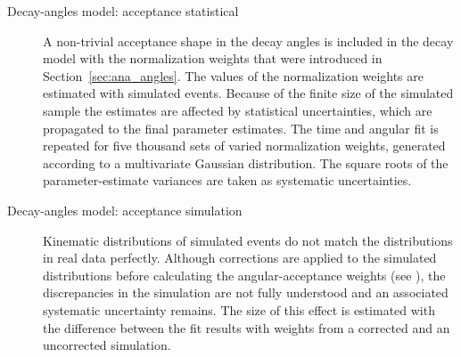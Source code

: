 \begin{description}
\item[Decay-angles model: acceptance statistical]
A non-trivial acceptance shape in the decay angles is included in the decay model with the normalization weights that were introduced in
Section~\ref{sec:ana_angles}. The values of the normalization weights are estimated with simulated events. Because of the finite size of
the simulated sample the estimates are affected by statistical uncertainties, which are propagated to the final parameter estimates. The
time and angular fit is repeated for five thousand sets of varied normalization weights, generated according to a multivariate Gaussian
distribution. The square roots of the parameter-estimate variances are taken as systematic uncertainties.

\item[Decay-angles model: acceptance simulation]
Kinematic distributions of simulated events do not match the distributions in real data perfectly. Although corrections are applied to the
simulated distributions before calculating the angular-acceptance weights (see \cite{LHCb-ANA-2014-039}), the discrepancies in the
simulation are not fully understood and an associated systematic uncertainty remains. The size of this effect is estimated with the
difference between the fit results with weights from a corrected and an uncorrected simulation.
\end{description}
